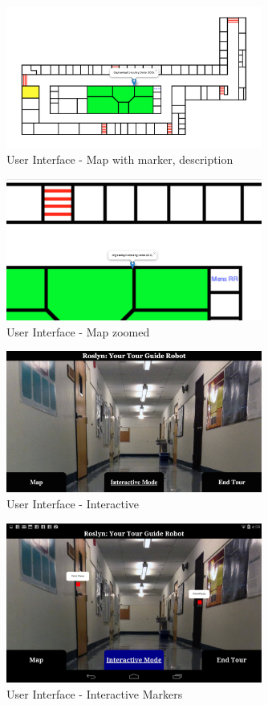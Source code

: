 \documentclass[11pt]{report}
\begin{document}
\begin{figure}[H]
 \centering
 \includegraphics[width=0.75\textwidth]{ui4.png}
 \caption{User Interface - Map with marker, description}
 \label{fig:ui4}
\end{figure}
\begin{figure}[H]
 \centering
 \includegraphics[width=0.75\textwidth]{ui5.png}
 \caption{User Interface - Map zoomed}
 \label{fig:ui5}
\end{figure}
\begin{figure}[H]
 \centering
 \includegraphics[width=0.75\textwidth]{ui6.png}
 \caption{User Interface - Interactive}
 \label{fig:ui6}
\end{figure}
\begin{figure}[H]
 \centering
 \includegraphics[width=0.75\textwidth]{ui7.png}
 \caption{User Interface - Interactive Markers}
 \label{fig:ui7}
\end{figure}
\end{document}
